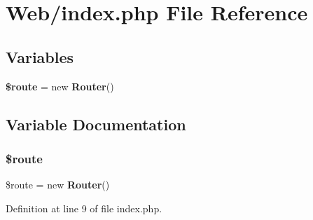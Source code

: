\section{Web/index.php File Reference}
\label{index_8php}
\subsection*{Variables}
\begin{DoxyCompactItemize}
\item 
\textbf{ \$route} = new \textbf{ Router}()
\end{DoxyCompactItemize}


\subsection{Variable Documentation}
\mbox{\label{index_8php_af4105acdee5d34dc96c2aec4058b81f9}} 
\subsubsection{\$route}
{\footnotesize\ttfamily \$route = new \textbf{ Router}()}



Definition at line 9 of file index.\+php.

